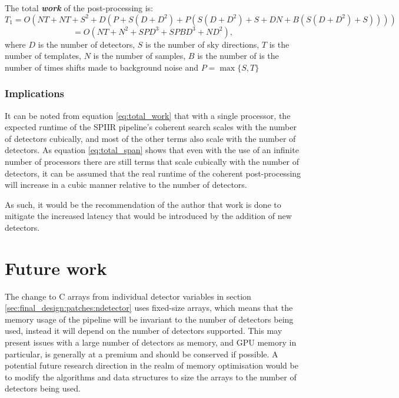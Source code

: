 \documentclass{article}
\begin{document}
The total \textit{\textbf{work}} of the post-processing is:
\[
    T_1 = O(NT + NT + S^2 + D(P + S(D + D^2) + P(S(D + D^2) + S + DN + B(S(D + D^2) + S))))
\]
\begin{equation} \label{eq:total_work}
    = O(NT + N^2 + SPD^3 + SPBD^3 + ND^2),
\end{equation}
where \(D\) is the number of detectors, \(S\) is the number of sky directions, \(T\) is the number of templates, \(N\) is the number of samples, \(B\) is the number of is the number of times shifts made to background noise and \(P = \max\{ S, T \}\)

\subsubsection{Implications} \label{sec:discuss:analysis:implications}

It can be noted from equation \ref{eq:total_work} that with a single processor, the expected runtime of the  SPIIR pipeline's coherent search scales with the number of detectors cubically, and most of the other terms also scale with the number of detectors.
As equation \ref{eq:total_span} shows that even with the use of an infinite number of processors there are still terms that scale cubically with the number of detectors, it can be assumed that the real runtime of the coherent post-processing will increase in a cubic manner relative to the number of detectors.

As such, it would be the recommendation of the author that work is done to mitigate the increased latency that would be introduced by the addition of new detectors.

\section{Future work} \label{sec:further_work}

The change to C arrays from individual detector variables in section \ref{sec:final_design:patches:ndetector} uses fixed-size arrays, which means that the memory usage of the pipeline will be invariant to the number of detectors being used, instead it will depend on the number of detectors supported.
This may present issues with a large number of detectors as memory, and GPU memory in particular, is generally at a premium and should be conserved if possible.
A potential future research direction in the realm of memory optimisation would be to modify the algorithms and data structures to size the arrays to the number of detectors being used.
\end{document}
